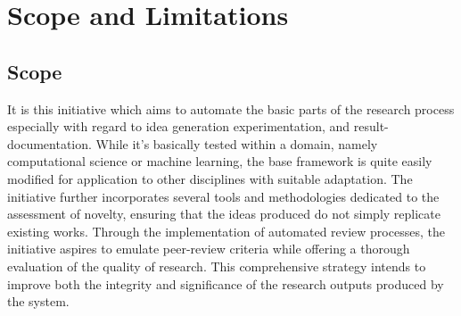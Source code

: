 \section{Scope and Limitations}
\subsection{Scope } 
It is this initiative which aims to automate the basic parts of the research process especially with regard to idea generation experimentation, and result-documentation. While it's basically tested within a domain, namely computational science or machine learning, the base framework is quite easily modified for application to other disciplines with suitable adaptation. 
The initiative further incorporates several tools and methodologies dedicated to the assessment of novelty, ensuring that the ideas produced do not simply replicate existing works. Through the implementation of automated review processes, the initiative aspires to emulate peer-review criteria while offering a thorough evaluation of the quality of research. This comprehensive strategy intends to improve both the integrity and significance of the research outputs produced by the system.

